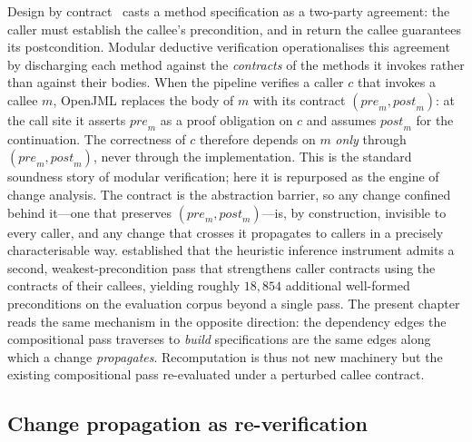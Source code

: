 Design by contract~\cite{meyer1992dbc} casts a method specification as a two-party agreement: the caller must establish the callee's precondition, and in return the callee guarantees its postcondition. Modular deductive verification operationalises this agreement by discharging each method against the \emph{contracts} of the methods it invokes rather than against their bodies. When the pipeline verifies a caller $c$ that invokes a callee $m$, OpenJML replaces the body of $m$ with its contract $(\mathit{pre}_m, \mathit{post}_m)$: at the call site it asserts $\mathit{pre}_m$ as a proof obligation on $c$ and assumes $\mathit{post}_m$ for the continuation. The correctness of $c$ therefore depends on $m$ \emph{only} through $(\mathit{pre}_m, \mathit{post}_m)$, never through the implementation. This is the standard soundness story of modular verification; here it is repurposed as the engine of change analysis. The contract is the abstraction barrier, so any change confined behind it---one that preserves $(\mathit{pre}_m, \mathit{post}_m)$---is, by construction, invisible to every caller, and any change that crosses it propagates to callers in a precisely characterisable way.  established that the heuristic inference instrument admits a second, weakest-precondition pass that strengthens caller contracts using the contracts of their callees, yielding roughly $18{,}854$ additional well-formed preconditions on the evaluation corpus beyond a single pass. The present chapter reads the same mechanism in the opposite direction: the dependency edges the compositional pass traverses to \emph{build} specifications are the same edges along which a change \emph{propagates}. Recomputation is thus not new machinery but the existing compositional pass re-evaluated under a perturbed callee contract.

\subsection{Change propagation as re-verification}\label{subsec:a5-reverify}

